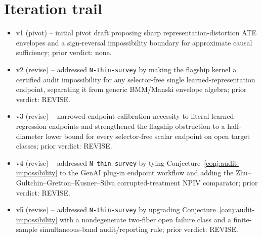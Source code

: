 \documentclass[11pt]{article}
\theoremstyle{definition}
\theoremstyle{plain}
\theoremstyle{remark}
\begin{document}
\section{Iteration trail}
\begin{itemize}[leftmargin=*]
\item v1 (pivot) -- initial pivot draft proposing sharp representation-distortion ATE envelopes and a sign-reversal impossibility boundary for approximate causal sufficiency; prior verdict: none.
\item v2 (revise) -- addressed \texttt{N-thin-survey} by making the flagship kernel a certified audit impossibility for any selector-free single learned-representation endpoint, separating it from generic BMM/Manski envelope algebra; prior verdict: REVISE.
\item v3 (revise) -- narrowed endpoint-calibration necessity to literal learned-regression endpoints and strengthened the flagship obstruction to a half-diameter lower bound for every selector-free scalar endpoint on open target classes; prior verdict: REVISE.
\item v4 (revise) -- addressed \texttt{N-thin-survey} by tying Conjecture~\ref{conj:audit-impossibility} to the GenAI plug-in endpoint workflow and adding the Zhu--Gultchin--Gretton--Kusner--Silva corrupted-treatment NPIV comparator; prior verdict: REVISE.
\item v5 (revise) -- addressed \texttt{N-thin-survey} by upgrading Conjecture~\ref{conj:audit-impossibility} with a nondegenerate two-fiber open failure class and a finite-sample simultaneous-band audit/reporting rule; prior verdict: REVISE.
\end{itemize}
\end{document}
